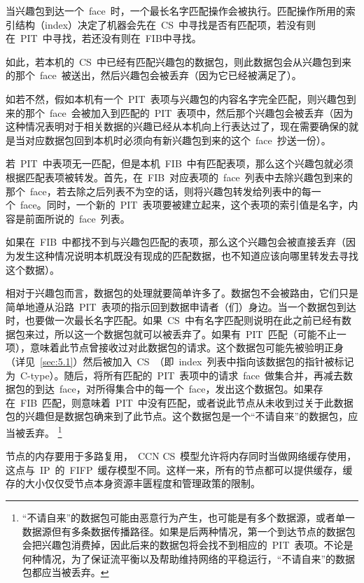 当兴趣包到达一个~face~时，一个最长名字匹配操作会被执行。匹配操作所用的索引结构（index）决定了机器会先在~CS~中寻找是否有匹配项，若没有则在~PIT~中寻找，若还没有则在~FIB中寻找。

如此，若本机的~CS~中已经有匹配兴趣包的数据包，则此数据包会从兴趣包到来的那个~face~被送出，然后兴趣包会被丢弃（因为它已经被满足了）。

如若不然，假如本机有一个~PIT~表项与兴趣包的内容名字完全匹配，则兴趣包到来的那个~face~会被加入到匹配的~PIT~表项中，然后那个兴趣包会被丢弃（因为这种情况表明对于相关数据的兴趣已经从本机向上行表达过了，现在需要确保的就是当对应数据包回到本机时必须向有新兴趣包到来的这个~face~抄送一份）。

若~PIT~中表项无一匹配，但是本机~FIB~中有匹配表项，那么这个兴趣包就必须根据匹配表项被转发。首先，在~FIB~对应表项的~face~列表中去除兴趣包到来的那个~face，若去除之后列表不为空的话，则将兴趣包转发给列表中的每一个~face。同时，一个新的~PIT~表项要被建立起来，这个表项的索引值是名字，内容是前面所说的~face~列表。

如果在~FIB~中都找不到与兴趣包匹配的表项，那么这个兴趣包会被直接丢弃（因为发生这种情况说明本机既没有现成的匹配数据，也不知道应该向哪里转发去寻找这个数据）。

相对于兴趣包而言，数据包的处理就要简单许多了。数据包不会被路由，它们只是简单地遵从沿路~PIT~表项的指示回到数据申请者（们）身边。当一个数据包到达时，也要做一次最长名字匹配。如果~CS~中有名字匹配则说明在此之前已经有数据包来过，所以这一个数据包就可以被丢弃了。如果有~PIT~匹配（可能不止一项），意味着此节点曾接收过对此数据包的请求。这个数据包可能先被验明正身（详见~\ref{sec:5.1}）然后被加入~CS~（即~index~列表中指向该数据包的指针被标记为~C-type）。随后，将所有匹配的~PIT~表项中的请求~face~做集合并，再减去数据包的到达~face，对所得集合中的每一个~face，发出这个数据包。如果存在~FIB~匹配，则意味着~PIT~中没有匹配，或者说此节点从未收到过关于此数据包的兴趣但是数据包确来到了此节点。这个数据包是一个“不请自来”的数据包，应当被丢弃。
\renewcommand\baselinestretch{1} %
\footnote{“不请自来”的数据包可能由恶意行为产生，也可能是有多个数据源，或者单一数据源但有多条数据传播路径。如果是后两种情况，第一个到达节点的数据包会把兴趣包消费掉，因此后来的数据包将会找不到相应的~PIT~表项。不论是何种情况，为了保证流平衡以及帮助维持网络的平稳运行，“不请自来”的数据包都应当被丢弃。}

节点的内存要用于多路复用，~CCN CS~模型允许将内存同时当做网络缓存使用，这点与~IP~的~FIFP~缓存模型不同。这样一来，所有的节点都可以提供缓存，缓存的大小仅仅受节点本身资源丰匮程度和管理政策的限制。

